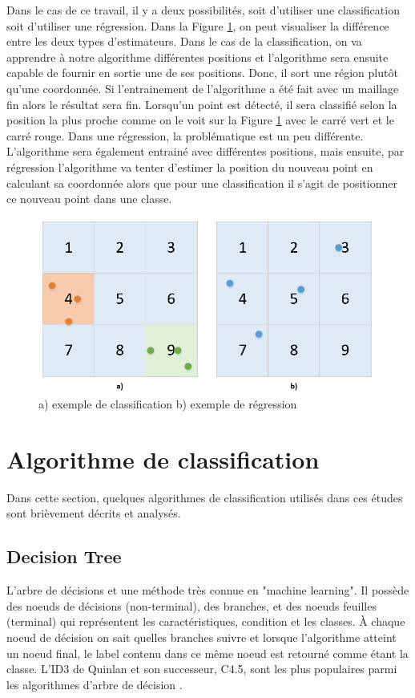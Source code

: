 Dans le cas de ce travail, il y a deux possibilités, soit d'utiliser une classification soit d'utiliser une régression. Dans la Figure \ref{fig:ClassReg}, on peut visualiser la différence entre les deux types d'estimateurs. Dans le cas de la classification, on va apprendre à notre algorithme différentes positions et l'algorithme sera ensuite capable de fournir en sortie une de ses positions. Donc, il sort une région plutôt qu'une coordonnée. Si l'entrainement de l'algorithme a été fait avec un maillage fin alors le résultat sera fin. Lorsqu'un point est détecté, il sera classifié selon la position la plus proche comme on le voit sur la Figure \ref{fig:ClassReg} avec le carré vert et le carré rouge. Dans une régression, la problématique est un peu différente. L'algorithme sera également entrainé avec différentes positions, mais ensuite, par régression l'algorithme va tenter d'estimer la position du nouveau point en calculant sa coordonnée alors que pour une classification il s’agit de positionner ce nouveau point dans une classe. 

\begin{figure}[htp]
 \begin{center}
  \includegraphics[scale=0.5]{figures/ClassReg.png}
  \caption{a) exemple de classification  b) exemple de régression}
  \label{fig:ClassReg} %
 \end{center}
\end{figure}

\section{Algorithme de classification}
Dans cette section, quelques algorithmes de classification utilisés dans ces études \cite{ML_indoor} \cite{CP_RSS} sont brièvement décrits et analysés.

\subsection{Decision Tree}
L'arbre de décisions et une méthode très connue en "machine learning". Il possède des noeuds de décisions (non-terminal), des branches, et des noeuds feuilles (terminal) qui représentent les caractéristiques, condition et les classes. À chaque noeud de décision on sait quelles branches suivre et lorsque l'algorithme atteint un noeud final, le label contenu dans ce même noeud est retourné comme étant la classe. 
L’ID3 de Quinlan et son successeur, C4.5, sont les plus populaires parmi les algorithmes d’arbre de décision \cite{C4_5}.

